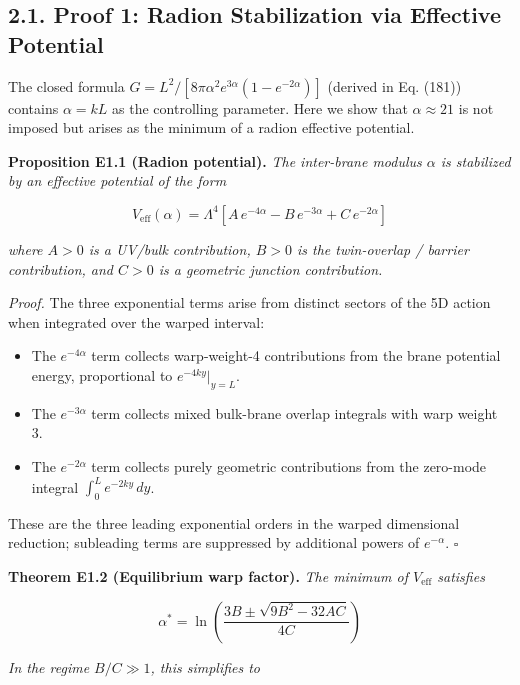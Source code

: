 \documentclass[
  11pt,
]{article}
\providecommand{\tightlist}{%
  \setlength{\itemsep}{0pt}\setlength{\parskip}{0pt}}
\begin{document}
\bigskip

\hypertarget{proof-1-radion-stabilization-via-effective-potential}{%
\subsection{2.1. Proof 1: Radion Stabilization via Effective
Potential}\label{proof-1-radion-stabilization-via-effective-potential}}

The closed formula
\(G = L^2/[8\pi\alpha^2 e^{3\alpha}(1-e^{-2\alpha})]\) (derived in Eq.
(181)) contains \(\alpha = kL\) as the controlling parameter. Here we
show that \(\alpha \approx 21\) is not imposed but arises as the minimum
of a radion effective potential.

\textbf{Proposition E1.1 (Radion potential).} \emph{The inter-brane
modulus \(\alpha\) is stabilized by an effective potential of the form}

\[V_{\text{eff}}(\alpha) = \Lambda^4\left[A\,e^{-4\alpha} - B\,e^{-3\alpha} + C\,e^{-2\alpha}\right] \tag{58}\]

\emph{where \(A > 0\) is a UV/bulk contribution, \(B > 0\) is the
twin-overlap / barrier contribution, and \(C > 0\) is a geometric
junction contribution.}

\emph{Proof.} The three exponential terms arise from distinct sectors of
the 5D action when integrated over the warped interval:

\begin{itemize}
\tightlist
\item
  The \(e^{-4\alpha}\) term collects warp-weight-4 contributions from
  the brane potential energy, proportional to \(e^{-4ky}|_{y=L}\).
\item
  The \(e^{-3\alpha}\) term collects mixed bulk-brane overlap integrals
  with warp weight 3.
\item
  The \(e^{-2\alpha}\) term collects purely geometric contributions from
  the zero-mode integral \(\int_0^L e^{-2ky}\,dy\).
\end{itemize}

These are the three leading exponential orders in the warped dimensional
reduction; subleading terms are suppressed by additional powers of
\(e^{-\alpha}\). \(\square\)

\textbf{Theorem E1.2 (Equilibrium warp factor).} \emph{The minimum of
\(V_{\text{eff}}\) satisfies}

\[\alpha^* = \ln\!\left(\frac{3B \pm \sqrt{9B^2 - 32AC}}{4C}\right) \tag{59}\]

\emph{In the regime \(B/C \gg 1\), this simplifies to}
\end{document}
